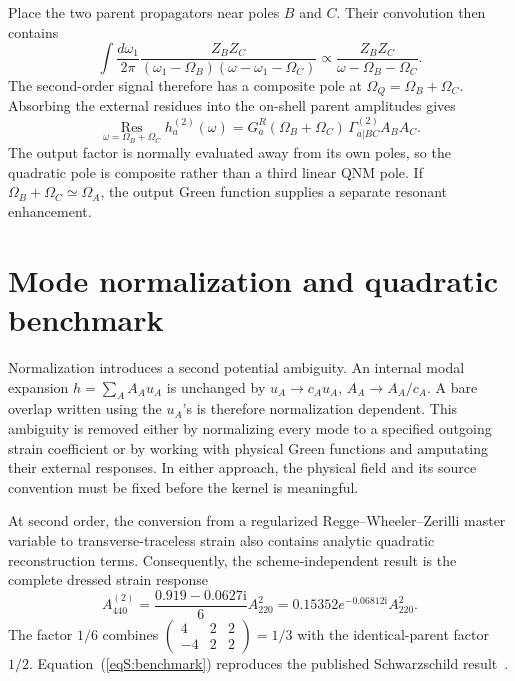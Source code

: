 \documentclass[
 reprint,
 amsmath,amssymb,
 aps,
 prl,
 superscriptaddress,
 nofootinbib
]{revtex4-2}
\newcommand{\Om}{\Omega}
\newcommand{\Res}{\operatorname*{Res}}
\newcommand{\ii}{\mathrm{i}}
\begin{document}
Place the two parent propagators near poles \(B\) and \(C\). Their convolution
then contains
\begin{equation}
\int\frac{d\omega_1}{2\pi}
\frac{Z_BZ_C}
{(\omega_1-\Om_B)(\omega-\omega_1-\Om_C)}
\propto
\frac{Z_BZ_C}{\omega-\Om_B-\Om_C}.
\label{eqS:convolution}
\end{equation}
The second-order signal therefore has a composite pole at
\(\Om_Q=\Om_B+\Om_C\). Absorbing the external residues into the on-shell
parent amplitudes gives
\begin{equation}
\Res_{\omega=\Om_B+\Om_C}h_a^{(2)}(\omega)
=G_a^R(\Om_B+\Om_C)\,
\Gamma^{(2)}_{a|BC}A_BA_C.
\label{eqS:factorization}
\end{equation}
The output factor is normally evaluated away from its own poles, so the
quadratic pole is composite rather than a third linear QNM pole. If
\(\Om_B+\Om_C\simeq\Om_A\), the output Green function supplies a separate
resonant enhancement.

\section{Mode normalization and quadratic benchmark}

Normalization introduces a second potential ambiguity. An internal modal
expansion \(h=\sum_A A_Au_A\) is unchanged by
\(u_A\to c_Au_A\), \(A_A\to A_A/c_A\). A bare overlap written using the
\(u_A\)'s is therefore normalization dependent. This ambiguity is removed
either by normalizing every mode to a specified outgoing strain coefficient
or by working with physical Green functions and amputating their external
responses. In either approach, the physical field and its source convention
must be fixed before the kernel is meaningful.

At second order, the conversion from a regularized
Regge--Wheeler--Zerilli master variable to transverse-traceless strain also
contains analytic quadratic reconstruction terms. Consequently, the
scheme-independent result is the complete dressed strain response
\begin{equation}
A_{440}^{(2)}
=\frac{0.919-0.0627\ii}{6}A_{220}^{2}
=0.15352e^{-0.06812\ii}A_{220}^{2}.
\label{eqS:benchmark}
\end{equation}
The factor \(1/6\) combines
\(
\left(\begin{smallmatrix}4&2&2\\-4&2&2\end{smallmatrix}\right)=1/3
\)
with the identical-parent factor \(1/2\). Equation~(\ref{eqS:benchmark})
reproduces the published Schwarzschild result~\cite{BucciottiEtAl2024PRD,
BucciottiEtAl2024JHEP}.
\end{document}

